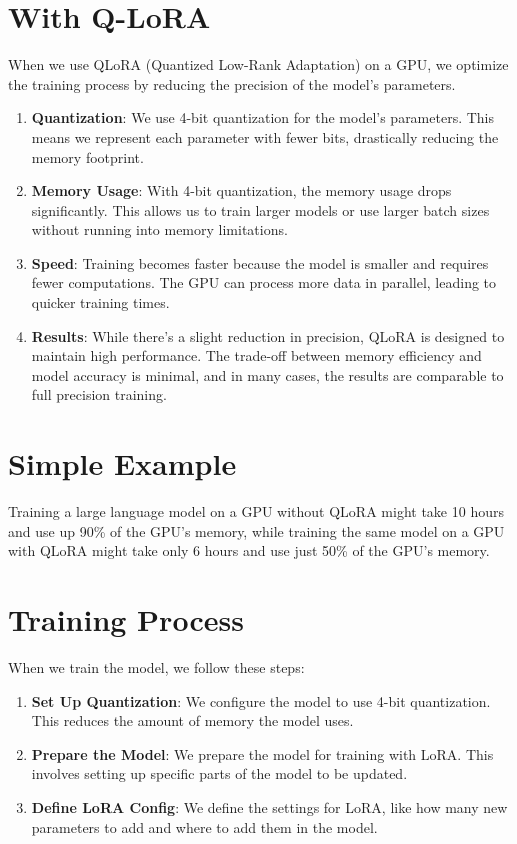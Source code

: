 \section{With Q-LoRA}
When we use QLoRA (Quantized Low-Rank Adaptation) on a GPU, we optimize the training process by reducing the precision of the model’s parameters.
\begin{enumerate}
    \item \textbf{Quantization}: We use 4-bit quantization for the model’s parameters. This means we represent each parameter with fewer bits, drastically reducing the memory footprint.
    \item \textbf{Memory Usage}: With 4-bit quantization, the memory usage drops significantly. This allows us to train larger models or use larger batch sizes without running into memory limitations.
    \item \textbf{Speed}: Training becomes faster because the model is smaller and requires fewer computations. The GPU can process more data in parallel, leading to quicker training times.
    \item \textbf{Results}: While there’s a slight reduction in precision, QLoRA is designed to maintain high performance. The trade-off between memory efficiency and model accuracy is minimal, and in many cases, the results are comparable to full precision training.
\end{enumerate}

\section{Simple Example}
Training a large language model on a GPU without QLoRA might take 10 hours and use up 90\% of the GPU's memory, while training the same model on a GPU with QLoRA might take only 6 hours and use just 50\% of the GPU's memory.

\section{Training Process}
When we train the model, we follow these steps:
\begin{enumerate}
    \item \textbf{Set Up Quantization}: We configure the model to use 4-bit quantization. This reduces the amount of memory the model uses.
    \item \textbf{Prepare the Model}: We prepare the model for training with LoRA. This involves setting up specific parts of the model to be updated.
    \item \textbf{Define LoRA Config}: We define the settings for LoRA, like how many new parameters to add and where to add them in the model.
\end{enumerate}

